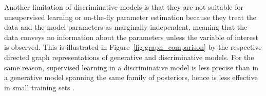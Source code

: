 \documentclass[english]{scrartcl}
\begin{document}




Another limitation of discriminative models is that they are not suitable for unsupervised learning or on-the-fly parameter estimation because they treat the data and the model parameters as marginally independent, meaning that the data conveys no information about the parameters unless the variable of interest is observed. This is illustrated in Figure~\ref{fig:graph_comparison} by the respective directed graph representations of generative and discriminative models. For the same reason, supervised learning in a discriminative model is less precise than in a generative model spanning the same family of posteriors, hence is less effective in small training sets \cite{Ng-01}. 

\end{document}
